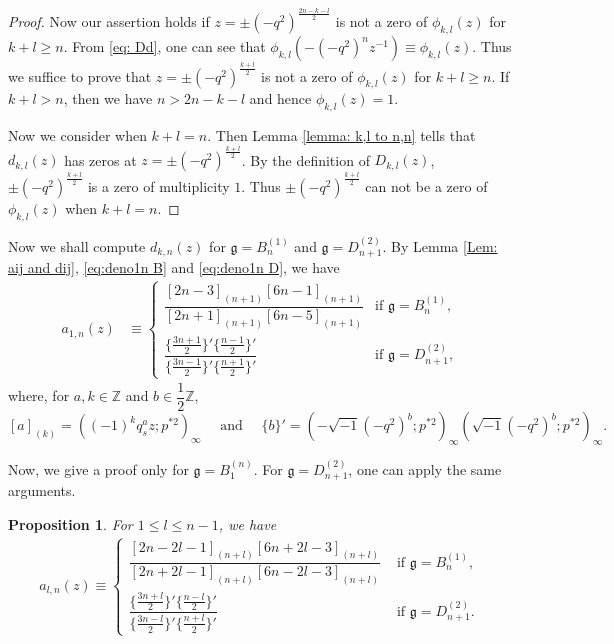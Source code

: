 \documentclass[11pt, leqno]{amsart}
\newtheorem{proposition}[theorem]{Proposition}
\theoremstyle{definition}
\numberwithin{equation}{section}
\begin{document}
\begin{proof}
Now our assertion holds if $z=\pm{(-q^2)}^{\frac{2n-k-l}{2}}$ is
not a zero of $\phi_{k,l}(z)$ for $k+l\ge n$.
From \eqref{eq: Dd}, one can see that
$\phi_{k,l}(-{(-q^2)}^{n}z^{-1})\equiv\phi_{k,l}(z)$. Thus we suffice to prove
that $z=\pm{(-q^2)}^{\frac{k+l}{2}}$ is not a zero of
$\phi_{k,l}(z)$ for $k+l\ge n$. If $k+l>n$, then we have $n > 2n-k-l$ and hence $\phi_{k,l}(z)=1$.

Now we consider when $k+l=n$. Then Lemma \ref{lemma: k,l to n,n} tells that $d_{k,l}(z)$ has zeros at
$z=\pm{(-q^2)}^{\frac{k+l}{2}}$. By the definition of ${D_{k,l}}(z)$,
$\pm{(-q^2)}^{\frac{k+l}{2}}$ is a zero of multiplicity $1$. Thus $\pm{(-q^2)}^{\frac{k+l}{2}}$ can not be a zero of
$\phi_{k,l}(z)$ when $k+l=n$.
\end{proof}

Now we shall compute $d_{k,n}(z)$ for ${\mathfrak g}=B^{(1)}_n$ and ${\mathfrak g}=D^{(2)}_{n+1}$.
By Lemma \ref{Lem: aij and dij}, \eqref{eq:deno1n B}
and \eqref{eq:deno1n D}, we have
\begin{align}
 a_{1,n}(z) & \equiv  \begin{cases} \dfrac{[2n-3]_{(n+1)}[6n-1]_{(n+1)}}{[2n+1]_{(n+1)}[6n-5]_{(n+1)}} & \text{if ${\mathfrak g}=B^{(1)}_{n}$,} \\[2ex]
                   \dfrac{ \{ \frac{3n+1}{2} \}' \{ \frac{n-1}{2} \}' }{ \{ \frac{3n-1}{2} \}' \{\frac{n+1}{2} \}' } & \text{if ${\mathfrak g}=D^{(2)}_{n+1}$,}
                   \end{cases}   \label{eq: a1n}
\end{align}
where, for $a,k \in {\mathbb Z}$ and $b \in \dfrac{1}{2}{\mathbb Z}$,
$$[a]_{(k)}=((-1)^kq_s^{a}z ; p^{*2})_\infty  \quad \text{ and } \quad \{ b\}' = ( -\sqrt{-1} {(-q^2)}^b; p^{*2})_\infty (\sqrt{-1}{(-q^2)}^b; p^{*2})_\infty.$$

Now, we give a proof only for ${\mathfrak g}=B^{(n)}_1$. For ${\mathfrak g}=D^{(2)}_{n+1}$, one can apply the same arguments.

\begin{proposition} \label{proposition: a_k,n }
  For $1\leq l \le  n-1$, we have
  \begin{align} \label{eq:aln}
    a_{l,n}(z) \equiv \begin{cases} \dfrac{[2n-2l-1]_{(n+l)}[6n+2l-3]_{(n+l)}}{[2n+2l-1]_{(n+l)}[6n-2l-3]_{(n+l)}} & \text{ if } {\mathfrak g} =B^{(1)}_n, \\
\dfrac{ \{ \frac{3n+l}{2} \}'  \{\frac{n-l}{2}\}' }{  \{ \frac{3n-l}{2} \}'  \{\frac{n+l}{2}\}' } & \text{ if } {\mathfrak g} =D^{(2)}_{n+1}. \end{cases}
  \end{align}
\end{proposition}
\end{document}
